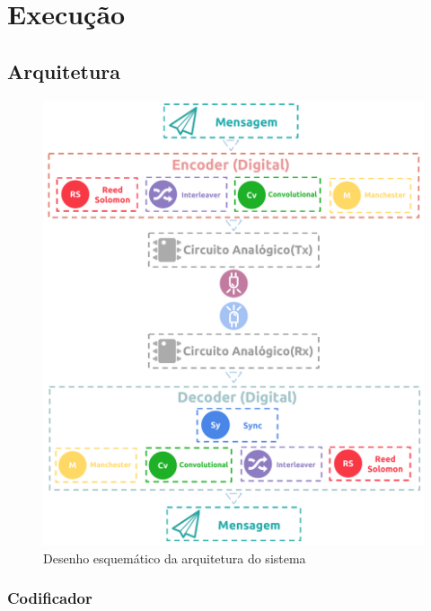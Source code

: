 	\chapter{Execução}\label{cap-execucao}
	
	\section{Arquitetura}
	
	\begin{figure}[htb]
		\caption{\label{fig_arch} Desenho esquemático da arquitetura do sistema}
		\centering
		\includegraphics[width=1\textwidth]{Arquitetura.pdf}
	\end{figure}
	
	\subsection{Codificador}
	
